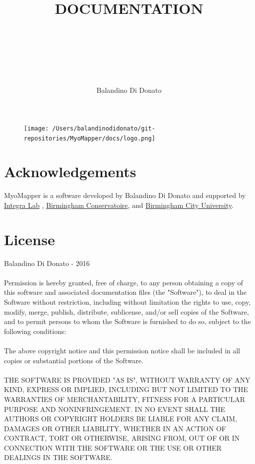 \documentclass[12pt,a4paper]{article}
\author{\\ \ \\ \ \\ \ \\ \ \\ \ \\ Balandino Di Donato}
\title{\\ \ \\ \ \\ DOCUMENTATION}
\begin{document}
\begin{figure}
	\centering
	\texttt{[image: /Users/balandinodidonato/git-repositories/MyoMapper/docs/logo.png]}
	\label{fig:MyoMapper}
\end{figure}

\maketitle
\thispagestyle{empty}	
	
\newpage
\tableofcontents
\thispagestyle{empty}	
\newpage


\section*{Acknowledgements}
MyoMapper is a software developed by Balandino Di Donato and supported by \href{http://integra.io/}{Integra Lab} , \href{http://www.bcu.ac.uk/conservatoire}{Birmingham Conservatoire}, and \href{http://www.bcu.ac.uk/}{Birmingham City University}.

\section*{License}

\textcopyright Balandino Di Donato - 2016\\ \\
Permission is hereby granted, free of charge, to any person obtaining a copy of this software and associated documentation files (the "Software"), to deal in the Software without restriction, including without limitation the rights to use, copy, modify, merge, publish, distribute, sublicense, and/or sell copies of the Software, and to permit persons to whom the Software is furnished to do so, subject to the following conditions: \\ \\
The above copyright notice and this permission notice shall be included in all copies or substantial portions of the Software. \\ \\
THE SOFTWARE IS PROVIDED "AS IS", WITHOUT WARRANTY OF ANY KIND, EXPRESS OR IMPLIED, INCLUDING BUT NOT LIMITED TO THE WARRANTIES OF MERCHANTABILITY, FITNESS FOR A PARTICULAR PURPOSE AND NONINFRINGEMENT. IN NO EVENT SHALL THE AUTHORS OR COPYRIGHT HOLDERS BE LIABLE FOR ANY CLAIM, DAMAGES OR OTHER LIABILITY, WHETHER IN AN ACTION OF CONTRACT, TORT OR OTHERWISE, ARISING FROM, OUT OF OR IN CONNECTION WITH THE SOFTWARE OR THE USE OR OTHER DEALINGS IN THE SOFTWARE.
\end{document}
